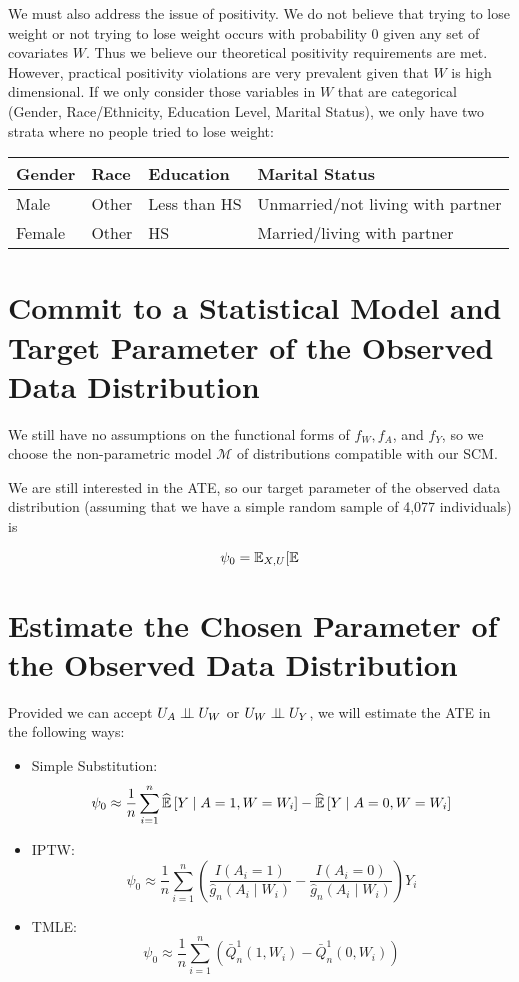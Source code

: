 \documentclass{article}
\begin{document}
We must also address the issue of positivity.  We do not believe that trying to lose weight or not trying to lose weight occurs with probability $0$ given any set of covariates $W$.  Thus we believe our theoretical positivity requirements are met.  However, practical positivity violations are very prevalent given that $W$ is high dimensional.  If we only consider those variables in $W$ that are categorical (Gender, Race/Ethnicity, Education Level, Marital Status), we only have two strata where no people tried to lose weight:

\begin{tabular}{| l | l | l | l |}
\hline
 Gender & Race & Education & Marital Status \\
\hline
Male & Other & Less than HS & Unmarried/not living with partner \\
Female & Other & HS & Married/living with partner \\
\hline
\end{tabular}

\section{Commit to a Statistical Model and Target Parameter of the Observed Data Distribution}

We still have no assumptions on the functional forms of $f_W, f_A$, and $f_Y$, so we choose the non-parametric model $\mathcal{M}$ of distributions compatible with our SCM.  

We are still interested in the ATE, so our target parameter of the observed data distribution (assuming that we have a simple random sample of 4,077 individuals) is

$$\psi_0 = \mathbb{E}_{X,U}[ \mathbb{E}$$

\section{Estimate the Chosen Parameter of the Observed Data Distribution}

Provided we can accept $U_A \perp\hspace{-5pt}\perp U_W$ or $U_W \perp\hspace{-5pt}\perp U_Y$, we will estimate the ATE in the following ways: 

\begin{itemize}
  \item Simple Substitution:
    \[
      \psi_0 \approx \frac{1}{n}\sum_{i=1}^{n}\widehat{\mathbb{E}}\left[Y \mid A=1, W=W_i \right] - \widehat{\mathbb{E}}\left[Y \mid A=0, W=W_i\right]
    \]
  \item IPTW:
  \[
    \psi_{0} \approx \frac{1}{n}\sum_{i=1}^{n} \left(\frac{I(A_i=1)}{\hat{g}_n(A_i \mid W_i)} - \frac{I(A_i=0)}{\hat{g}_n(A_i \mid W_i)} \right)Y_i
  \]
  \item TMLE:
  \[
    \psi_{0} \approx \frac{1}{n}\sum_{i=1}^{n}\left( \bar{Q}_{n}^{1}(1,W_i) - \bar{Q}_{n}^{1}(0,W_i)\right)
  \]
\end{itemize}
\end{document}
